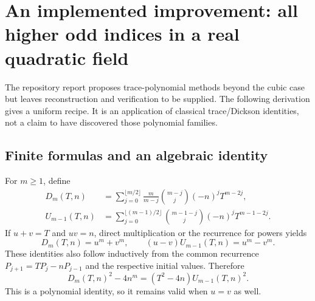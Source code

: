 \documentclass[11pt,a4paper]{article}
\theoremstyle{remark}\newtheorem{remark}[theorem]{Remark}
\begin{document}
\section{An implemented improvement: all higher odd indices in a real quadratic field}
\label{sec:odd}
The repository report proposes trace-polynomial methods beyond the cubic case but leaves reconstruction and verification to be supplied.\cite{report} The following derivation gives a uniform recipe. It is an application of classical trace/Dickson identities, not a claim to have discovered those polynomial families.

\subsection{Finite formulas and an algebraic identity}
For $m\ge1$, define
\begin{align}
 D_m(T,n)&=\sum_{j=0}^{\lfloor m/2\rfloor}
   \frac{m}{m-j}\binom{m-j}{j}(-n)^jT^{m-2j},\label{eq:D}\\
 U_{m-1}(T,n)&=\sum_{j=0}^{\lfloor(m-1)/2\rfloor}
   \binom{m-1-j}{j}(-n)^jT^{m-1-2j}.\label{eq:U}
\end{align}
If $u+v=T$ and $uv=n$, direct multiplication or the recurrence for powers yields
\[
 D_m(T,n)=u^m+v^m,\qquad
 (u-v)U_{m-1}(T,n)=u^m-v^m.
\]
These identities also follow inductively from the common recurrence $P_{j+1}=TP_j-nP_{j-1}$ and the respective initial values. Therefore
\begin{equation}\label{eq:fundamental}
 D_m(T,n)^2-4n^m=(T^2-4n)U_{m-1}(T,n)^2.
\end{equation}
This is a polynomial identity, so it remains valid when $u=v$ as well.
\end{document}
